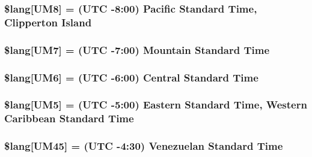 \subsubsection[{\$lang}]{\setlength{\rightskip}{0pt plus 5cm}\$lang\mbox{[}\textquotesingle{}U\+M8\textquotesingle{}\mbox{]} = \textquotesingle{}(U\+T\+C -\/8\+:00) Pacific Standard Time, Clipperton Island\textquotesingle{}}\label{date__lang_8php_ab3ed4c273fcb61197ef7d8e4bae07415}
\hypertarget{date__lang_8php_aa642f12cf461f915682b17c0c30b2475}{}
\subsubsection[{\$lang}]{\setlength{\rightskip}{0pt plus 5cm}\$lang\mbox{[}\textquotesingle{}U\+M7\textquotesingle{}\mbox{]} = \textquotesingle{}(U\+T\+C -\/7\+:00) Mountain Standard Time\textquotesingle{}}\label{date__lang_8php_aa642f12cf461f915682b17c0c30b2475}
\hypertarget{date__lang_8php_a30f39dd7748d488f4a0140751336d257}{}
\subsubsection[{\$lang}]{\setlength{\rightskip}{0pt plus 5cm}\$lang\mbox{[}\textquotesingle{}U\+M6\textquotesingle{}\mbox{]} = \textquotesingle{}(U\+T\+C -\/6\+:00) Central Standard Time\textquotesingle{}}\label{date__lang_8php_a30f39dd7748d488f4a0140751336d257}
\hypertarget{date__lang_8php_a557150a51633e11dc49e3bfd2e1c091e}{}
\subsubsection[{\$lang}]{\setlength{\rightskip}{0pt plus 5cm}\$lang\mbox{[}\textquotesingle{}U\+M5\textquotesingle{}\mbox{]} = \textquotesingle{}(U\+T\+C -\/5\+:00) Eastern Standard Time, Western Caribbean Standard Time\textquotesingle{}}\label{date__lang_8php_a557150a51633e11dc49e3bfd2e1c091e}
\hypertarget{date__lang_8php_aac9f8a1e0da4b3cee00a19fe9ac642d0}{}
\subsubsection[{\$lang}]{\setlength{\rightskip}{0pt plus 5cm}\$lang\mbox{[}\textquotesingle{}U\+M45\textquotesingle{}\mbox{]} = \textquotesingle{}(U\+T\+C -\/4\+:30) Venezuelan Standard Time\textquotesingle{}}\label{date__lang_8php_aac9f8a1e0da4b3cee00a19fe9ac642d0}
\hypertarget{date__lang_8php_a42f66872f4a082bcb2ee004bd2716828}{}
